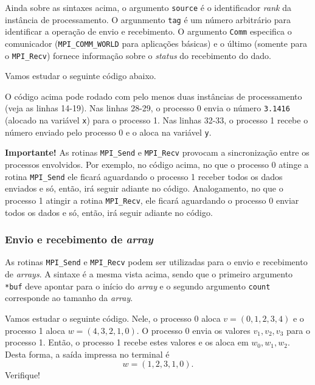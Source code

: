 Ainda sobre as sintaxes acima, o argumento \verb+source+ é o identificador {\it rank} da instância de processamento. O argunmento \verb+tag+ é um número arbitrário para identificar a operação de envio e recebimento. O argumento \verb+Comm+ especifica o comunicador (\verb+MPI_COMM_WORLD+ para aplicações básicas) e o último (somente para o \verb+MPI_Recv+) fornece informação sobre o {\it status} do recebimento do dado.

Vamos estudar o seguinte código abaixo.



O código acima pode rodado com pelo menos duas instâncias de processamento (veja as linhas 14-19). Nas linhas 28-29, o processo 0 envia o número \verb+3.1416+ (alocado na variável \verb+x+) para o processo 1. Nas linhas 32-33, o processo 1 recebe o número enviado pelo processo 0 e o aloca na variável \verb+y+.

{\bf Importante!} As rotinas \verb+MPI_Send+ e \verb+MPI_Recv+ provocam a sincronização entre os processos envolvidos. Por exemplo, no código acima, no que o processo 0 atinge a rotina \verb+MPI_Send+ ele ficará aguardando o processo 1 receber todos os dados enviados e só, então, irá seguir adiante no código. Analogamento, no que o processo 1 atingir a rotina \verb+MPI_Recv+, ele ficará aguardando o processo 0 enviar todos os dados e só, então, irá seguir adiante no código.

\subsubsection {Envio e recebimento de {\it array}}

As rotinas \verb+MPI_Send+ e \verb+MPI_Recv+ podem ser utilizadas para o envio e recebimento de {\it arrays}. A sintaxe é a mesma vista acima, sendo que o primeiro argumento \verb+*buf+ deve apontar para o início do {\it array} e o segundo argumento \verb+count+ corresponde ao tamanho da {\it array}.

Vamos estudar o seguinte código. Nele, o processo 0 aloca $v = (0,1,2,3,4)$ e o processo 1 aloca $w = (4,3,2,1,0)$. O processo 0 envia os valores $v_1, v_2, v_3$ para o processo 1. Então, o processo 1 recebe estes valores e os aloca em $w_0, w_1, w_2$. Desta forma, a saída impressa no terminal é
\begin{equation}
  w = (1, 2, 3, 1, 0).
\end{equation}
Verifique!

